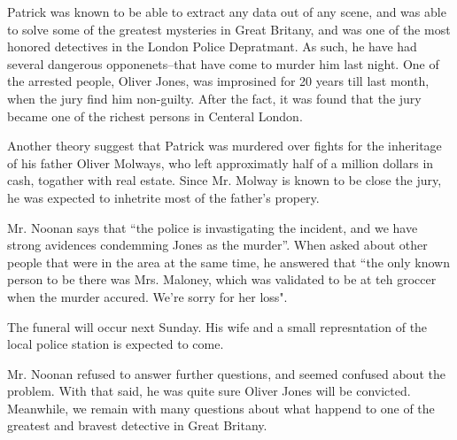\documentclass[]{article}
\begin{document}
\begin{multicols}{2}
		\noindent Patrick was known to be able to extract any data out of any scene, and was able to solve some of the greatest mysteries in Great Britany, and was one of the most honored detectives in the London Police Depratmant. As such, he have had several dangerous opponenets--that have come to murder him last night. One of the arrested people, Oliver Jones, was improsined for 20 years till last month, when the jury find him non-guilty. After the fact, it was found that the jury became one of the richest persons in Centeral London. 
		
		Another theory suggest that Patrick was murdered over fights for the inheritage of his father Oliver Molways, who left approximatly half of a million dollars in cash, togather with real estate. Since Mr. Molway is known to be close the jury, he was expected to inhetrite most of the father's propery. 
		
		Mr. Noonan says that ``the police is invastigating the incident, and we have strong avidences condemming Jones as the murder''. When asked about other people that were in the area at the same time, he answered that ``the only known person to be there was Mrs. Maloney, which was validated to be at teh groccer when the murder accured. We're sorry for her loss". 
		
		The funeral will occur next Sunday. His wife and a small represntation of the local police station is expected to come. 
		
		Mr. Noonan refused to answer further questions, and seemed confused about the problem. With that said, he was quite sure Oliver Jones will be convicted. Meanwhile, we remain with many questions about what happend to one of the greatest and bravest detective in Great Britany. 
		
	\end{multicols}
	
	\vfill
	
\end{document}
